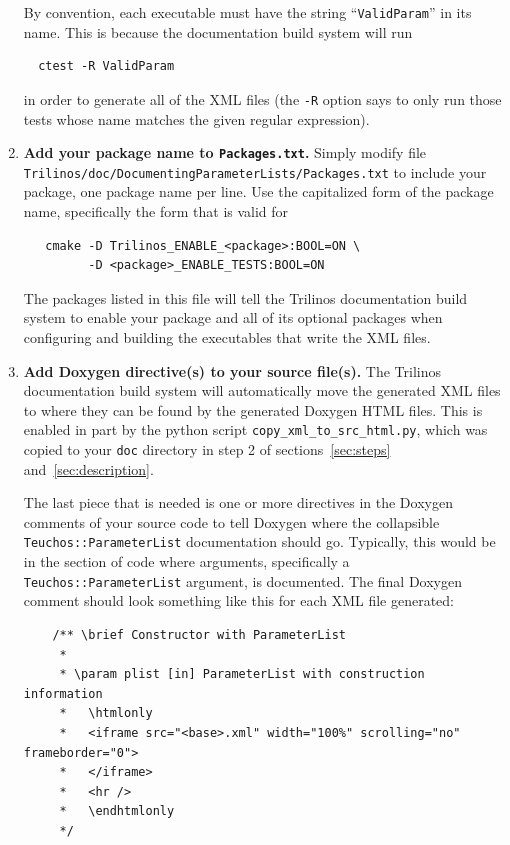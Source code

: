 \documentclass[pdf,ps2pdf,12pt]{smemo}
\begin{document}
\begin{memo}
\begin{enumerate}
  By convention, each executable must have the string
  ``\texttt{ValidParam}'' in its name.  This is because the
  documentation build system will run

 \begin{verbatim}
  ctest -R ValidParam
 \end{verbatim}

  in order to generate all of the XML files (the \texttt{-R} option
  says to only run those tests whose name matches the given regular
  expression).

\item \textbf{Add your package name to \texttt{Packages.txt}.} Simply
  modify file
  \texttt{Trilinos/\-doc/\-Documenting\-Parameter\-Lists/\-Packages.txt}
  to include your package, one package name per line.  Use the
  capitalized form of the package name, specifically the form that is
  valid for

 \begin{verbatim}
   cmake -D Trilinos_ENABLE_<package>:BOOL=ON \
         -D <package>_ENABLE_TESTS:BOOL=ON
 \end{verbatim}

  The packages listed in this file will tell the Trilinos
  documentation build system to enable your package and all of its
  optional packages when configuring and building the executables that
  write the XML files.

\item \textbf{Add Doxygen directive(s) to your source file(s).} The
  Trilinos documentation build system will automatically move the
  generated XML files to where they can be found by the generated
  Doxygen HTML files.  This is enabled in part by the python script
  \texttt{copy\_xml\_to\_src\_html.py}, which was copied to your
  \texttt{doc} directory in step 2 of sections~\ref{sec:steps}
  and~\ref{sec:description}.

  The last piece that is needed is one or more directives in the
  Doxygen comments of your source code to tell Doxygen where the
  collapsible \texttt{Teuchos::ParameterList} documentation should
  go. Typically, this would be in the section of code where arguments,
  specifically a \texttt{Teuchos::ParameterList} argument, is
  documented. The final Doxygen comment should look something like
  this for each XML file generated:

 \footnotesize
 \begin{verbatim}
    /** \brief Constructor with ParameterList
     * 
     * \param plist [in] ParameterList with construction information
     *   \htmlonly
     *   <iframe src="<base>.xml" width="100%" scrolling="no" frameborder="0">
     *   </iframe>
     *   <hr />
     *   \endhtmlonly
     */
 \end{verbatim}
 \normalsize


\end{enumerate}
\end{memo}
\end{document}

